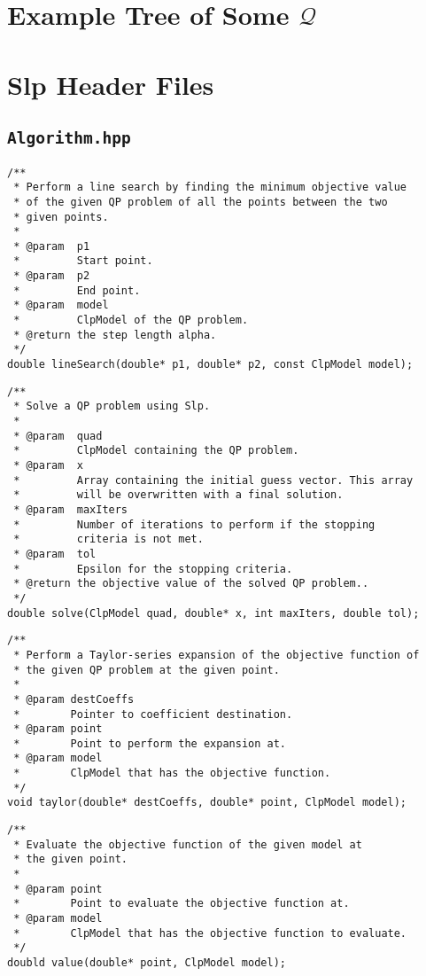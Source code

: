 \appendix
\chapter{Example Tree of Some $\mathcal{Q}$}
\label{app:tree}
\centering


\chapter{Slp Header Files}

\section*{\texttt{Algorithm.hpp}}
\begin{verbatim}
/**
 * Perform a line search by finding the minimum objective value
 * of the given QP problem of all the points between the two
 * given points.
 *
 * @param  p1
 *         Start point.
 * @param  p2
 *         End point.
 * @param  model
 *         ClpModel of the QP problem.
 * @return the step length alpha.
 */
double lineSearch(double* p1, double* p2, const ClpModel model);
\end{verbatim}

\begin{verbatim}
/**
 * Solve a QP problem using Slp.
 *
 * @param  quad
 *         ClpModel containing the QP problem.
 * @param  x
 *         Array containing the initial guess vector. This array
 *         will be overwritten with a final solution.
 * @param  maxIters
 *         Number of iterations to perform if the stopping
 *         criteria is not met.
 * @param  tol
 *         Epsilon for the stopping criteria.
 * @return the objective value of the solved QP problem..
 */
double solve(ClpModel quad, double* x, int maxIters, double tol);
\end{verbatim}

\newpage

\begin{verbatim}
/**
 * Perform a Taylor-series expansion of the objective function of
 * the given QP problem at the given point.
 *
 * @param destCoeffs
 *        Pointer to coefficient destination.
 * @param point
 *        Point to perform the expansion at.
 * @param model
 *        ClpModel that has the objective function.
 */
void taylor(double* destCoeffs, double* point, ClpModel model);
\end{verbatim}

\begin{verbatim}
/**
 * Evaluate the objective function of the given model at
 * the given point.
 *
 * @param point
 *        Point to evaluate the objective function at.
 * @param model
 *        ClpModel that has the objective function to evaluate.
 */
doubld value(double* point, ClpModel model);
\end{verbatim}
